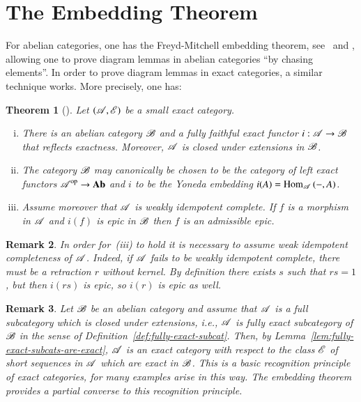 \documentclass[1p]{elsarticle}
\theoremstyle{mythm}
\newtheorem{Thm}{Theorem}[section]
\theoremstyle{mydef}
\newtheorem{Rem}[Thm]{Remark}
\begin{document}
\appendix


\section{The Embedding Theorem}
\label{sec:the-embedding-theorem}

For abelian categories, one has the Freyd-Mitchell embedding theorem, 
see~\cite{MR0166240} and \cite{MR0167511}, allowing one to prove
diagram lemmas in abelian categories ``by chasing elements''. 
In order to prove diagram lemmas in exact categories, a similar
technique works. More precisely, one has:

\begin{Thm}[{\cite[A.7.1, A.7.16]{MR1106918}}]
  \label{thm:embedding-thm}
  Let $(\operatorname{\mathscr{A}}, \operatorname{\mathscr{E}})$ be a small exact category.
  \begin{enumerate}[(i)]
    \item
      There is an abelian category $\operatorname{\mathscr{B}}$ and a fully faithful
      exact functor $i: \operatorname{\mathscr{A}} \to \operatorname{\mathscr{B}}$ that reflects
      exactness. Moreover, $\operatorname{\mathscr{A}}$ is closed under extensions in
      $\operatorname{\mathscr{B}}$. 

    \item
      The category $\operatorname{\mathscr{B}}$ may canonically be chosen to be the
      category of left exact functors $\operatorname{\mathscr{A}}^{\operatorname{op}} \to \operatorname{\mathbf{Ab}}$ and $i$
      to be the Yoneda embedding $i(A) = \operatorname{Hom}_{\operatorname{\mathscr{A}}}{({-},A)}$.

    \item 
      Assume moreover that $\operatorname{\mathscr{A}}$ is weakly idempotent complete.
      If $f$ is a morphism in $\operatorname{\mathscr{A}}$ and $i(f)$ is epic
      in $\operatorname{\mathscr{B}}$ then $f$ is an admissible epic.
  \end{enumerate}
\end{Thm}

\begin{Rem}
  In order for~(iii) to hold it is necessary to assume weak idempotent
  completeness of $\operatorname{\mathscr{A}}$. Indeed, if $\operatorname{\mathscr{A}}$ fails to be weakly
  idempotent complete, there must be a retraction $r$ without
  kernel. By definition there exists $s$ such that $rs = 1$, but then
  $i(rs)$ is epic, so $i(r)$ is epic as well.
\end{Rem}

\begin{Rem}
  Let $\operatorname{\mathscr{B}}$ be an abelian category and assume that $\operatorname{\mathscr{A}}$ is a full
  subcategory which is closed under extensions, i.e., $\operatorname{\mathscr{A}}$ is fully
  exact subcategory of $\operatorname{\mathscr{B}}$
  in the sense of Definition~\ref{def:fully-exact-subcat}. Then, by 
  Lemma~\ref{lem:fully-exact-subcats-are-exact},
  $\operatorname{\mathscr{A}}$ is an exact category with respect to the class $\operatorname{\mathscr{E}}$ of
  short sequences in $\operatorname{\mathscr{A}}$ which are exact in $\operatorname{\mathscr{B}}$. This is a
  basic recognition principle of exact categories, for many examples
  arise in this way. The embedding
  theorem provides a partial converse to this recognition principle.
\end{Rem}
\end{document}
